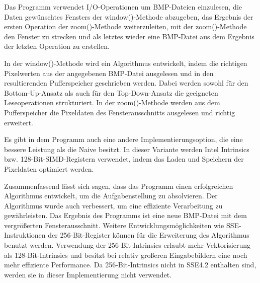 \documentclass[course=erap]{aspdoc}
\begin{document}
    Das Programm verwendet I/O-Operationen um BMP-Dateien einzulesen, die Daten gewünschtes Fensters der window()-Methode abzugeben,
    das Ergebnis der ersten Operation der zoom()-Methode weiterzuleiten, mit der zoom()-Methode den Fenster zu strecken und als letztes
    wieder eine BMP-Datei aus dem Ergebnis der letzten Operation zu erstellen.

    In der window()-Methode wird ein Algorithmus entwickelt, indem die richtigen Pixelwerten aus der angegebenen BMP-Datei ausgelesen
    und in den resultierenden Pufferspeicher geschrieben werden. Dabei werden sowohl für den Bottom-Up-Ansatz als auch für den Top-Down-Ansatz
    die geeigneten Leseoperationen strukturiert. In der zoom()-Methode werden aus dem Pufferspeicher die Pixeldaten des Fensterausschnitts
    ausgelesen und richtig erweitert.

    Es gibt in dem Programm auch eine andere Implementierungsoption, die eine bessere Leistung als die Naive besitzt.
    In dieser Variante werden Intel Intrinsics bzw. 128-Bit-SIMD-Registern verwendet, indem das Laden und
    Speichern der Pixeldaten optimiert werden.

    Zusammenfassend lässt sich sagen, dass das Programm einen erfolgreichen Algorithmus entwickelt, um die Aufgabenstellung zu
    absolvieren. Der Algorithmus wurde auch verbessert, um eine effiziente Verarbeitung zu gewährleisten. Das Ergebnis des Programms
    ist eine neue BMP-Datei mit dem vergrößerten Fensterausschnitt. Weitere Entwicklungsmöglichkeiten wie SSE-Instruktionen der
    256-Bit-Register können für die Erweiterung des Algorithmus benutzt werden. Verwendung der 256-Bit-Intrinsics erlaubt mehr
    Vektorisierung als 128-Bit-Intrinsics und besitzt bei relativ großeren Eingabebildern eine noch mehr effiziente Performance.
    Da 256-Bit-Intrinsics nicht in SSE4.2 enthalten sind, werden sie in dieser Implementierung nicht verwendet.

    
    {}
\end{document}
